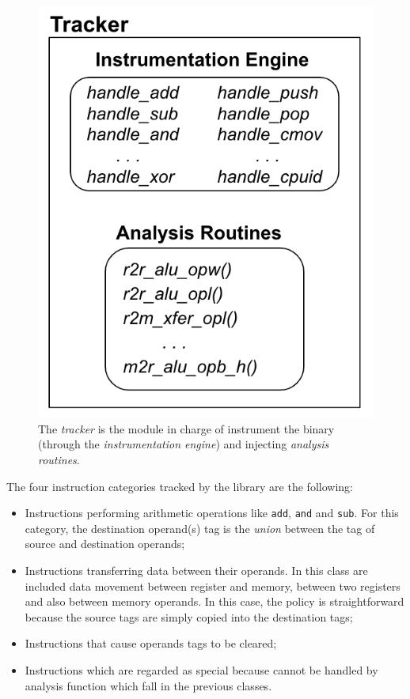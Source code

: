 \documentclass[LaM,binding=0.6cm]{sapthesis}
\begin{document}
\begin{figure}[h!]
\centering
\includegraphics[scale=.6]{images/techn13}
\caption{The \textit{tracker} is the module in charge of instrument the binary (through the \textit{instrumentation engine}) and injecting \textit{analysis routines}.}
\end{figure}

\clearpage
\noindent
The four instruction categories tracked by the library are the following:
\begin{itemize}
\item Instructions performing arithmetic operations like \texttt{add}, \texttt{and} and \texttt{sub}. For this category, the destination operand(s) tag is the \textit{union} between the tag of source and destination operands;
\item Instructions transferring data between their operands. In this class are included data movement between register and memory, between two registers and also between memory operands. In this case, the policy is straightforward because the source tags are simply copied into the destination tags;
\item Instructions that cause operands tags to be cleared;
\item Instructions which are regarded as special because cannot be handled by analysis function which fall in the previous classes.
\end{itemize}
\end{document}
